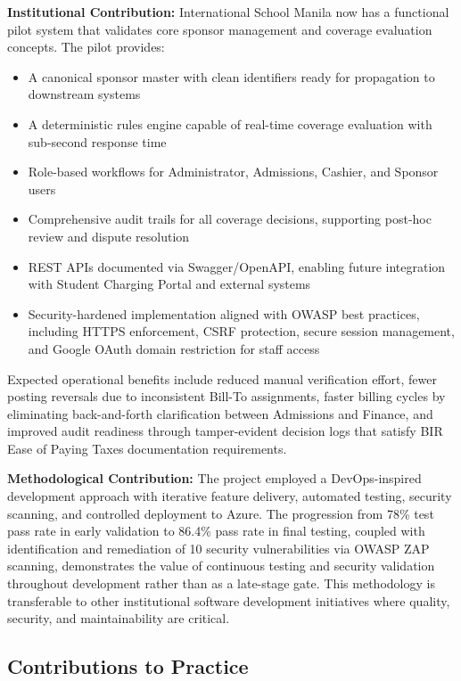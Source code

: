 \textbf{Institutional Contribution:} International School Manila now has a functional pilot system that validates core sponsor management and coverage evaluation concepts. The pilot provides:

\begin{itemize}
    \item A canonical sponsor master with clean identifiers ready for propagation to downstream systems
    \item A deterministic rules engine capable of real-time coverage evaluation with sub-second response time
    \item Role-based workflows for Administrator, Admissions, Cashier, and Sponsor users
    \item Comprehensive audit trails for all coverage decisions, supporting post-hoc review and dispute resolution
    \item REST APIs documented via Swagger/OpenAPI, enabling future integration with Student Charging Portal and external systems
    \item Security-hardened implementation aligned with OWASP best practices, including HTTPS enforcement, CSRF protection, secure session management, and Google OAuth domain restriction for staff access
\end{itemize}

Expected operational benefits include reduced manual verification effort, fewer posting reversals due to inconsistent Bill-To assignments, faster billing cycles by eliminating back-and-forth clarification between Admissions and Finance, and improved audit readiness through tamper-evident decision logs that satisfy BIR Ease of Paying Taxes documentation requirements.

\textbf{Methodological Contribution:} The project employed a DevOps-inspired development approach with iterative feature delivery, automated testing, security scanning, and controlled deployment to Azure. The progression from 78\% test pass rate in early validation to 86.4\% pass rate in final testing, coupled with identification and remediation of 10 security vulnerabilities via OWASP ZAP scanning, demonstrates the value of continuous testing and security validation throughout development rather than as a late-stage gate. This methodology is transferable to other institutional software development initiatives where quality, security, and maintainability are critical.

\subsection{Contributions to Practice}

